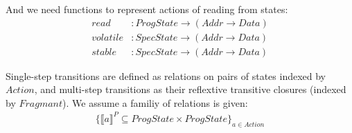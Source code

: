\documentclass[a4paper,11pt]{article}
\theoremstyle{definition}
\begin{document}
And we need functions to represent actions of reading from states:
\begin{align*}
	read &: \mathit{ProgState} \to (\mathit{Addr} \to \mathit{Data})\\
	volatile &: \mathit{SpecState} \to (\mathit{Addr} \to \mathit{Data})\\
	stable &: \mathit{SpecState} \to (\mathit{Addr} \to \mathit{Data})
\end{align*}

\newpage

Single-step transitions are defined as relations on pairs of states indexed by $\mathit{Action}$, and multi-step transitions as their reflextive transitive closures (indexed by $\mathit{Fragmant}$). We assume a familiy of relations is given:
\begin{align*}
	\{ \llbracket a \rrbracket^P \subseteq \mathit{ProgState \times ProgState} \}_\mathit{a \in Action}
\end{align*}
\end{document}
